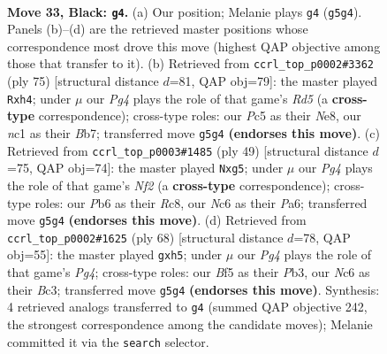 \documentclass[11pt]{article}
\begin{document}
\clearpage

\begin{figure}[p]\centering
\begin{subfigure}{0.46\textwidth}\centering
\resizebox{\linewidth}{!}{%
\newchessgame
\chessboard[
  setfen={5r2/4r1k1/ppn5/2p1pbp1/P4P2/2P5/1K4PP/2N1RBNR b - - 0 33},
  showmover=false,
  pgfstyle=straightmove, color=movearrow, markmove={g5-g4}
]}
\caption{}
\end{subfigure}\hfill
\begin{subfigure}{0.46\textwidth}\centering
\resizebox{\linewidth}{!}{%
\newchessgame
\chessboard[
  setfen={4nk2/1b4rp/5p2/4pPP1/1Ppr3P/4N3/1P1NR3/4K1R1 b - - 2 38},
  showmover=false,
  pgfstyle=straightmove, color=movearrow, markmove={d4-h4}
]}
\caption{}
\end{subfigure}
\\[4pt]
\begin{subfigure}{0.46\textwidth}\centering
\resizebox{\linewidth}{!}{%
\newchessgame
\chessboard[
  setfen={2r1k2r/5n2/p1pbp3/1p4B1/2P1P2p/5P2/PP4P1/1K1R1B1R b k - 0 25},
  showmover=false,
  pgfstyle=straightmove, color=movearrow, markmove={f7-g5}
]}
\caption{}
\end{subfigure}\hfill
\begin{subfigure}{0.46\textwidth}\centering
\resizebox{\linewidth}{!}{%
\newchessgame
\chessboard[
  setfen={4rn2/1p1r1k2/p1pP1p2/7p/5PPp/1PB5/P2R1K2/7R w - - 0 35},
  showmover=false,
  pgfstyle=straightmove, color=movearrow, markmove={g4-h5}
]}
\caption{}
\end{subfigure}
\caption{\textbf{Move 33, Black: \texttt{g4}.} (a) Our position; Melanie plays \texttt{g4} (\texttt{g5g4}). Panels (b)--(d) are the retrieved master positions whose correspondence most drove this move (highest QAP objective among those that transfer to it). (b) Retrieved from \texttt{ccrl\_top\_p0002\#3362} (ply 75) [structural distance $d$=81, QAP obj=79]: the master played \texttt{Rxh4}; under $\mu$ our \emph{Pg4} plays the role of that game's \emph{Rd5} (a \textbf{cross-type} correspondence); cross-type roles: our \emph{P}c5 as their \emph{N}e8, our \emph{n}c1 as their \emph{B}b7; transferred move \texttt{g5g4} \textbf{(endorses this move)}. (c) Retrieved from \texttt{ccrl\_top\_p0003\#1485} (ply 49) [structural distance $d$=75, QAP obj=74]: the master played \texttt{Nxg5}; under $\mu$ our \emph{Pg4} plays the role of that game's \emph{Nf2} (a \textbf{cross-type} correspondence); cross-type roles: our \emph{P}b6 as their \emph{R}c8, our \emph{N}c6 as their \emph{P}a6; transferred move \texttt{g5g4} \textbf{(endorses this move)}. (d) Retrieved from \texttt{ccrl\_top\_p0002\#1625} (ply 68) [structural distance $d$=78, QAP obj=55]: the master played \texttt{gxh5}; under $\mu$ our \emph{Pg4} plays the role of that game's \emph{Pg4}; cross-type roles: our \emph{B}f5 as their \emph{P}b3, our \emph{N}c6 as their \emph{B}c3; transferred move \texttt{g5g4} \textbf{(endorses this move)}. Synthesis: 4 retrieved analogs transferred to \texttt{g4} (summed QAP objective 242, the strongest correspondence among the candidate moves); Melanie committed it via the \texttt{search} selector.}
\label{fig:thought-m65}
\end{figure}
\end{document}
